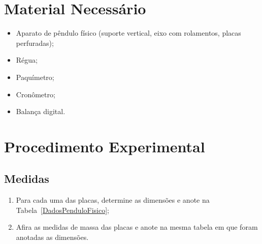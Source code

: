 \section{Material Necessário}

\begin{itemize}
	\item Aparato de pêndulo físico (suporte vertical, eixo com rolamentos, placas perfuradas);
	\item Régua;
	\item Paquímetro;
	\item Cronômetro;
	\item Balança digital.
\end{itemize}

\section{Procedimento Experimental}

\subsection{Medidas} %
\begin{enumerate}
	\item Para cada uma das placas, determine as dimensões e anote na Tabela~\ref{DadosPenduloFisico};
	\item Afira as medidas de massa das placas e anote na mesma tabela em que foram anotadas as dimensões.
\end{enumerate}

